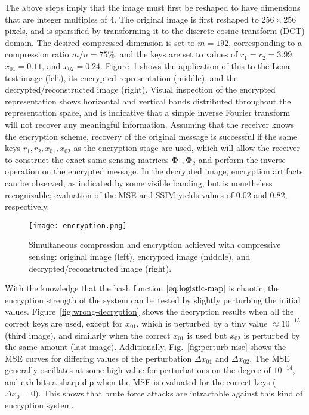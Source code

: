 The above steps imply that the image must first be reshaped to have dimensions that are integer multiples of 4. The original image is first reshaped to $256 \times 256$ pixels, and is sparsified by transforming it to the discrete cosine transform (DCT) domain. The desired compressed dimension is set to $m = 192$, corresponding to a compression ratio $m/n = 75\%$, and the keys are set to values of $r_1 = r_2 = 3.99$, $x_{01} = 0.11$, and $x_{02} = 0.24$. Figure~\ref{fig:encryption} shows the application of this to the Lena test image (left), its encrypted representation (middle), and the decrypted/reconstructed image (right). Visual inspection of the encrypted representation shows horizontal and vertical bands distributed throughout the representation space, and is indicative that a simple inverse Fourier transform will not recover any meaningful information. Assuming that the receiver knows the encryption scheme, recovery of the original message is successful if the same keys $r_1, r_2, x_{01}, x_{02}$ as the encryption stage are used, which will allow the receiver to construct the exact same sensing matrices $\bm\Phi_1, \bm\Phi_2$ and perform the inverse operation on the encrypted message. In the decrypted image, encryption artifacts can be observed, as indicated by some visible banding, but is nonetheless recognizable; evaluation of the MSE and SSIM yields values of 0.02 and 0.82, respectively.

\begin{figure}[htb]
	\texttt{[image: encryption.png]}
	\caption{Simultaneous compression and encryption achieved with compressive sensing: original image (left), encrypted image (middle), and decrypted/reconstructed image (right).}
	\label{fig:encryption}
\end{figure}

With the knowledge that the hash function $\eqref{eq:logistic-map}$ is chaotic, the encryption strength of the system can be tested by slightly perturbing the initial values. Figure~\ref{fig:wrong-decryption} shows the decryption results when all the correct keys are used, except for $x_{01}$, which is perturbed by a tiny value $\approx 10^{-15}$ (third image), and similarly when the correct $x_{01}$ is used but $x_{02}$ is perturbed by the same amount (last image). Additionally, Fig.~\ref{fig:perturb-mse} shows the MSE curves for differing values of the perturbation $\Delta x_{01}$ and $\Delta x_{02}$. The MSE generally oscillates at some high value for perturbations on the degree of $10^{-14}$, and exhibits a sharp dip when the MSE is evaluated for the correct keys ($\Delta x_0 = 0$). This shows that brute force attacks are intractable against this kind of encryption system.

